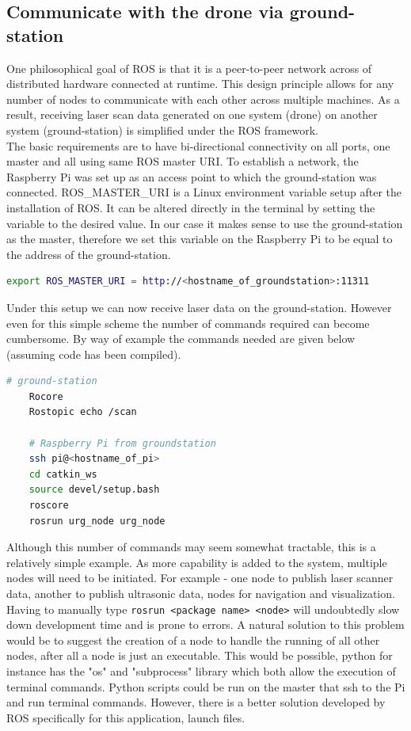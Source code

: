 \documentclass[capstone_report.tex]{subfiles}
\begin{document}
\subsection{Communicate with the drone via ground-station}
One philosophical goal of ROS is that it is a peer-to-peer network across of distributed hardware connected at runtime.  This design principle allows for any number of nodes to communicate with each other across multiple machines.  As a result, receiving laser scan data generated on one system (drone) on another system (ground-station) is simplified under the ROS framework.\\

The basic requirements are to have bi-directional connectivity on all ports, one master and all using same ROS master URI.  To establish a network, the Raspberry Pi was set up as an access point to which the ground-station was connected.  ROS\_MASTER\_URI is a Linux environment variable setup after the installation of ROS.  It can be altered directly in the terminal by setting the variable to the desired value.  In our case it makes sense to use the ground-station as the master, therefore we set this variable on the Raspberry Pi to be equal to the address of the ground-station.

\begin{lstlisting}[language=bash]
    export ROS_MASTER_URI = http://<hostname_of_groundstation>:11311
\end{lstlisting}

Under this setup we can now receive laser data on the ground-station.  However even for this simple scheme the number of commands required can become cumbersome.  By way of example the commands needed are given below (assuming code has been compiled).

\begin{lstlisting}[language=bash]
    # ground-station
    Rocore 
    Rostopic echo /scan

    # Raspberry Pi from groundstation
    ssh pi@<hostname_of_pi>
    cd catkin_ws
    source devel/setup.bash
    roscore
    rosrun urg_node urg_node
\end{lstlisting}

Although this number of commands may seem somewhat tractable, this is a relatively simple example.  As more capability is added to the system, multiple nodes will need to be initiated.  For example - one node to publish laser scanner data, another to publish ultrasonic data, nodes for navigation and visualization.  Having to manually type \texttt{rosrun <package name> <node>} will undoubtedly slow down development time and is prone to errors.  A natural solution to this problem would be to suggest the creation of a node to handle the running of all other nodes, after all a node is just an executable.  This would be possible, python for instance has the "os" and "subprocess" library which both allow the execution of terminal commands.  Python scripts could be run on the master that ssh to the Pi and run terminal commands. However, there is a better solution developed by ROS specifically for this application, launch files.\\
\end{document}
